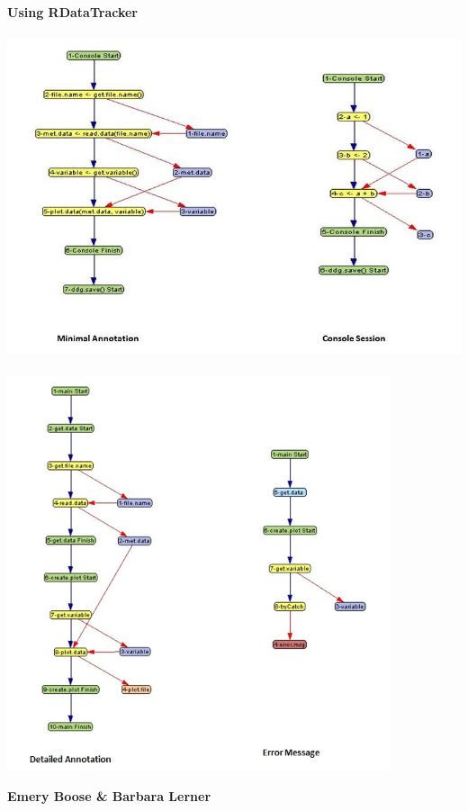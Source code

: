 \documentclass[letterpaper]{article}
\title{}
\begin{document}
\clearpage\setcounter{page}{1}\pagestyle{Standard}
{\centering
\textbf{Using RDataTracker}
\par}

\begin{center}
\includegraphics[width=5.4067in,height=3.7594in]{UsingRDataTracker-img/UsingRDataTracker-img001.jpg}
\end{center}
\begin{center}
\includegraphics[width=4.4232in,height=4.5724in]{UsingRDataTracker-img/UsingRDataTracker-img002.jpg}
\end{center}
{\centering
\textbf{Emery Boose \& Barbara Lerner}
\par}
\end{document}
